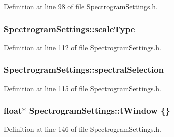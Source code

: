 Definition at line 98 of file Spectrogram\+Settings.\+h.

\subsubsection[{\texorpdfstring{scale\+Type}{scaleType}}]{ Spectrogram\+Settings\+::scale\+Type}\hypertarget{class_spectrogram_settings_a8c6871ffc9d2f3f645e9d14c24920e04}{}\label{class_spectrogram_settings_a8c6871ffc9d2f3f645e9d14c24920e04}


Definition at line 112 of file Spectrogram\+Settings.\+h.

\subsubsection[{\texorpdfstring{spectral\+Selection}{spectralSelection}}]{ Spectrogram\+Settings\+::spectral\+Selection}\hypertarget{class_spectrogram_settings_ae3ff6b7a5c58d9dd6d720004b42039ec}{}\label{class_spectrogram_settings_ae3ff6b7a5c58d9dd6d720004b42039ec}


Definition at line 115 of file Spectrogram\+Settings.\+h.

\subsubsection[{\texorpdfstring{t\+Window}{tWindow}}]{\setlength{\rightskip}{0pt plus 5cm}float$\ast$ Spectrogram\+Settings\+::t\+Window \{\}\hspace{0.3cm}{\ttfamily [mutable]}}\hypertarget{class_spectrogram_settings_acb25f1d76f20e850da96b0fe784f92ce}{}\label{class_spectrogram_settings_acb25f1d76f20e850da96b0fe784f92ce}


Definition at line 146 of file Spectrogram\+Settings.\+h.

